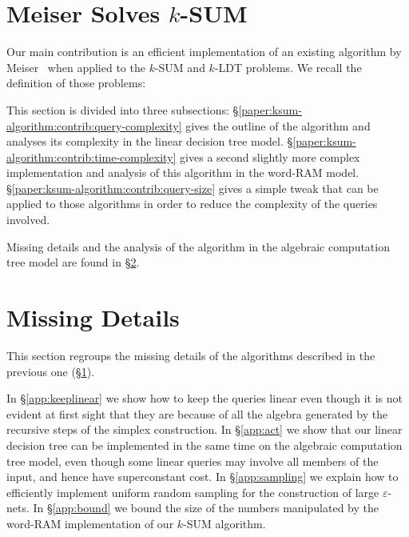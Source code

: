 \section{Meiser Solves \texorpdfstring{$k$-SUM}{k-SUM}}%
\label{paper:ksum-algorithm:proofs}

Our main contribution is an efficient implementation of an
existing algorithm by Meiser~\cite{Mei93} when applied to the
\(k\)-SUM
and
\(k\)-LDT
problems.
%
We recall the definition of those problems:
%
\restate{\ProblemKSUM*}
\restate{\ProblemKLDT*}

This section is divided into three subsections:
\S\ref{paper:ksum-algorithm:contrib:query-complexity} gives the outline of the
algorithm and analyses its complexity in the linear decision tree model.
\S\ref{paper:ksum-algorithm:contrib:time-complexity} gives a second
slightly more complex implementation and analysis of this algorithm in the word-RAM
model. \S\ref{paper:ksum-algorithm:contrib:query-size} gives a simple
tweak that can be applied to those algorithms in order to reduce the complexity
of the queries involved.

Missing details and the analysis of the algorithm in the algebraic computation
tree model are found in \S\ref{paper:ksum-algorithm:details}.





\section{Missing Details}\label{paper:ksum-algorithm:details}

This section regroups the missing details of the algorithms described in the
previous one (\S\ref{paper:ksum-algorithm:proofs}).

In \S\ref{app:keeplinear} we show how to keep the queries linear even though it
is not evident at first sight that they are because of all the algebra
generated by the recursive steps of the simplex construction.
%
In \S\ref{app:act} we show that our linear decision tree can be implemented in
the same time on the algebraic computation tree model, even though some linear
queries may involve all members of the input, and hence have superconstant
cost.
%
In \S\ref{app:sampling} we explain how to efficiently implement uniform random sampling
for the construction of large \(\varepsilon\)-nets.
%
In \S\ref{app:bound} we bound the size of the numbers manipulated by the
word-RAM implementation of our \(k\)-SUM algorithm.





